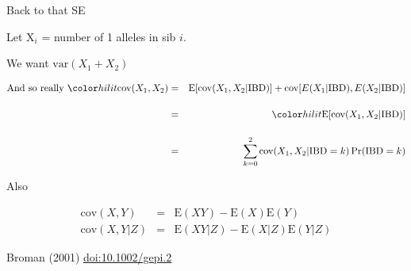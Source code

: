 \documentclass[aspectratio=169,12pt,t]{beamer}
\begin{document}
\begin{frame}[c]{}

\note{
}

\end{frame}

\begin{frame}[c]{}

\note{
}

\end{frame}



\begin{frame}{Back to that SE}


  Let X$_i$ = number of 1 alleles in sib $i$.

  \bigskip

  We want $\text{var}(X_1 + X_2)$

  \bigskip

  \begin{eqnarray*}
  \text{And so really } {\hilit \text{cov}(X_1, X_2)} & = & \text{E}[\text{cov}(X_1, X_2 | \text{IBD})] + \text{cov}[E(X_1|\text{IBD}), E(X_2|\text{IBD})] \\[12pt]
   & = & {\hilit \text{E}[\text{cov}(X_1, X_2|\text{IBD})]} \\[12pt]
   & = & \sum_{k=0}^{2} \text{cov}(X_1, X_2|\text{IBD}=k) \, \text{Pr}(\text{IBD}=k)
   \end{eqnarray*}


\note{
}

\end{frame}



\begin{frame}{Also}

\bigskip

  \begin{eqnarray*}
    \text{cov}(X,Y) & = & \text{E}(XY) - \text{E}(X) \text{E}(Y) \\[24pt]
    \text{cov}(X,Y|Z) & = & \text{E}(XY|Z) - \text{E}(X|Z) \text{E}(Y|Z)
   \end{eqnarray*}


\note{
}

\end{frame}



\begin{frame}[c]{}


\vspace{3mm}

\hfill \footnotesize {\lolit Broman (2001)
  \href{https://doi.org/10.1002/gepi.2}{doi:10.1002/gepi.2}}


\note{
}

\end{frame}
\end{document}
